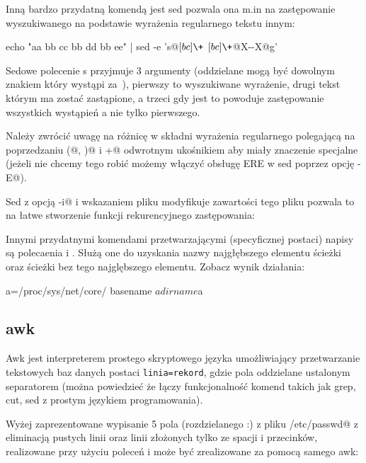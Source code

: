 \documentclass{pdfBooklets}
\begin{document}
Inną bardzo przydatną komendą jest sed pozwala ona m.in na zastępowanie
wyszukiwanego na podstawie wyrażenia regularnego tekstu innym:
\begin{CodeFrame*}[bash]{}
echo "aa bb cc bb dd bb ee" | sed -e 's@\([bc]\+\) \([bc]\+\)@X-\2-X@g'
\end{CodeFrame*}

Sedowe polecenie s przyjmuje 3 argumenty (oddzielane mogą być dowolnym znakiem który wystąpi za~\Verb@s@),
pierwszy to wyszukiwane wyrażenie, drugi tekst którym ma zostać zastąpione,
a trzeci gdy jest \Verb@g@ to powoduje zastępowanie wszystkich wystąpień a nie tylko pierwszego.

Należy zwrócić uwagę na różnicę w składni wyrażenia regularnego polegającą na poprzedzaniu
\Verb@(@, \Verb@)@ i \Verb@+@ odwrotnym ukośnikiem aby miały znaczenie specjalne
(jeżeli nie chcemy tego robić możemy włączyć obsługę ERE w sed poprzez opcję \Verb@-E@).

Sed z opcją \Verb@-i@ i wskazaniem pliku modyfikuje zawartości tego pliku pozwala to na łatwe stworzenie funkcji rekurencyjnego zastępowania:

Innymi przydatnymi komendami przetwarzającymi (specyficznej postaci) napisy są polecaenia \Verb@basename@ i \Verb@dirname@.
Służą one do uzyskania nazwy najgłębszego elementu ścieżki oraz ścieżki bez tego najglębszego elementu. Zobacz wynik działania:
\begin{CodeFrame*}[bash]{}
a=/proc/sys/net/core/
basename $a
dirname $a
\end{CodeFrame*}

\subsection{awk}

Awk jest interpreterem prostego skryptowego języka umożliwiający przetwarzanie tekstowych baz danych postaci \texttt{linia=rekord}, gdzie pola oddzielane ustalonym separatorem (można powiedzieć że łączy funkcjonalność komend takich jak grep, cut, sed z prostym językiem programowania).


Wyżej zaprezentowane wypisanie 5 pola (rozdzielanego :) z pliku \Verb@/etc/passwd@  z eliminacją pustych linii oraz
linii złożonych tylko ze spacji i przecinków, realizowane przy użyciu poleceń \Verb@cut@ i \Verb@grep@
może być zrealizowane za pomocą samego awk:
\end{document}
